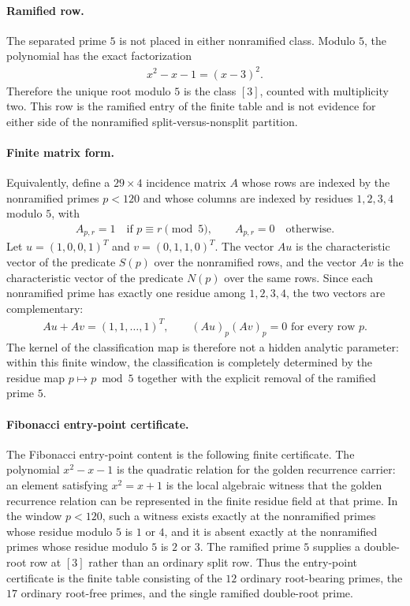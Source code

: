 \paragraph{Ramified row.}
The separated prime $5$ is not placed in either nonramified class.  Modulo $5$, the polynomial has the exact factorization
$$
\begin{aligned}
x^2-x-1=(x-3)^2.
\end{aligned}
$$
Therefore the unique root modulo $5$ is the class $[3]$, counted with multiplicity two.  This row is the ramified entry of the finite table and is not evidence for either side of the nonramified split-versus-nonsplit partition.

\paragraph{Finite matrix form.}
Equivalently, define a $29\times 4$ incidence matrix $A$ whose rows are indexed by the nonramified primes $p<120$ and whose columns are indexed by residues $1,2,3,4$ modulo $5$, with
$$
\begin{aligned}
A_{p,r}=1 \quad \text{if } p\equiv r \pmod 5,\qquad A_{p,r}=0 \quad \text{otherwise}.
\end{aligned}
$$
Let $u=(1,0,0,1)^T$ and $v=(0,1,1,0)^T$.  The vector $Au$ is the characteristic vector of the predicate $S(p)$ over the nonramified rows, and the vector $Av$ is the characteristic vector of the predicate $N(p)$ over the same rows.  Since each nonramified prime has exactly one residue among $1,2,3,4$, the two vectors are complementary:
$$
\begin{aligned}
Au+Av=(1,1,\ldots,1)^T,\qquad (Au)_p(Av)_p=0 \text{ for every row } p.
\end{aligned}
$$
The kernel of the classification map is therefore not a hidden analytic parameter: within this finite window, the classification is completely determined by the residue map $p\mapsto p\bmod 5$ together with the explicit removal of the ramified prime $5$.

\paragraph{Fibonacci entry-point certificate.}
The Fibonacci entry-point content is the following finite certificate.  The polynomial $x^2-x-1$ is the quadratic relation for the golden recurrence carrier: an element satisfying $x^2=x+1$ is the local algebraic witness that the golden recurrence relation can be represented in the finite residue field at that prime.  In the window $p<120$, such a witness exists exactly at the nonramified primes whose residue modulo $5$ is $1$ or $4$, and it is absent exactly at the nonramified primes whose residue modulo $5$ is $2$ or $3$.  The ramified prime $5$ supplies a double-root row at $[3]$ rather than an ordinary split row.  Thus the entry-point certificate is the finite table consisting of the $12$ ordinary root-bearing primes, the $17$ ordinary root-free primes, and the single ramified double-root prime.

